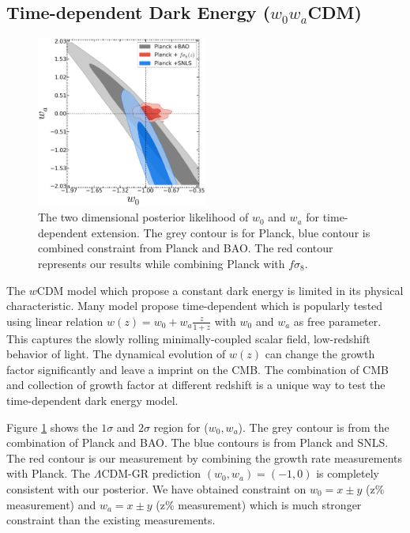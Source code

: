 \subsection{Time-dependent Dark Energy ($w_0 w_a$CDM)}
\begin{figure}
\includegraphics[width=0.5\textwidth]{plots/Like-2D/w0wa-w-wa_2D.png}
\caption{The two dimensional posterior likelihood of $w_0$ and $w_a$  for time-dependent extension. The grey contour is for Planck, blue contour is combined constraint from Planck and BAO. The red contour represents  our results while combining Planck with $f\sigma_8$.}
\label{fig:w0waCDM}
\end{figure}

The $w$CDM model which propose a constant dark energy is limited in its physical characteristic. Many model propose time-dependent which is popularly tested using linear relation $w(z)=w_0 +w_a \frac{z}{1+z}$ with $w_0$ and $w_a$ as free parameter. This captures the slowly rolling minimally-coupled scalar field, low-redshift behavior of light. The dynamical evolution of $w(z)$ can change the growth factor significantly and leave a imprint on the CMB. The combination of CMB and collection of growth factor at different redshift is a unique way to test the time-dependent dark energy model.

Figure \ref{fig:w0waCDM} shows the $1\sigma$ and $2\sigma$ region for ($w_0,w_a$). The grey contour is from the combination of Planck and BAO. The blue contours is from Planck and SNLS. The red contour is our measurement by combining the growth rate measurements with Planck. The $\Lambda$CDM-GR prediction $(w_0,w_a)=(-1,0)$ is completely consistent with our posterior. We have obtained constraint on $w_0=x \pm y$ (z\% measurement) and $w_a=x \pm y$ (z\% measurement) which is much stronger constraint than the existing measurements.


